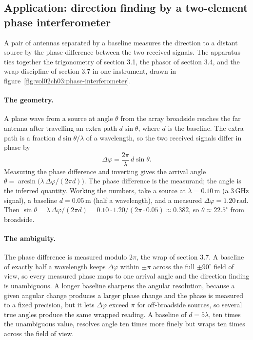 \subsection{Application: direction finding by a two-element phase
interferometer}

A pair of antennas separated by a baseline measures the direction to a
distant source by the phase difference between the two received signals. The
apparatus ties together the trigonometry of section 3.1, the phasor of
section 3.4, and the wrap discipline of section 3.7 in one instrument, drawn
in figure~\ref{fig:vol02ch03:phase-interferometer}.

\paragraph{The geometry.} A plane wave from a source at angle $\theta$ from
the array broadside reaches the far antenna after travelling an extra path
$d\sin\theta$, where $d$ is the baseline. The extra path is a fraction
$d\sin\theta/\lambda$ of a wavelength, so the two received signals differ in
phase by
\[
\Delta\varphi = \frac{2\pi}{\lambda}\,d\sin\theta.
\]
Measuring the phase difference and inverting gives the arrival angle
$\theta = \arcsin\!\big(\lambda\,\Delta\varphi/(2\pi d)\big)$. The phase
difference is the measurand; the angle is the inferred quantity. Working the
numbers, take a source at $\lambda = 0.10\,\text{m}$ (a $3\,\si{\giga\hertz}$
signal), a baseline $d = 0.05\,\text{m}$ (half a wavelength), and a measured
$\Delta\varphi = 1.20\,\text{rad}$. Then $\sin\theta = \lambda\,\Delta\varphi/
(2\pi d) = 0.10\cdot 1.20/(2\pi\cdot 0.05) \approx 0.382$, so $\theta \approx
22.5^{\circ}$ from broadside.

\paragraph{The ambiguity.} The phase difference is measured modulo $2\pi$,
the wrap of section 3.7. A baseline of exactly half a wavelength keeps
$\Delta\varphi$ within $\pm\pi$ across the full $\pm 90^{\circ}$ field of
view, so every measured phase maps to one arrival angle and the direction
finding is unambiguous. A longer baseline sharpens the angular resolution,
because a given angular change produces a larger phase change and the phase
is measured to a fixed precision, but it lets $\Delta\varphi$ exceed $\pi$ for
off-broadside sources, so several true angles produce the same wrapped
reading. A baseline of $d = 5\lambda$, ten times the unambiguous value,
resolves angle ten times more finely but wraps ten times across the field of
view.

